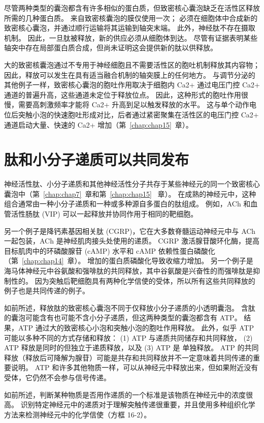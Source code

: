 尽管两种类型的囊泡都含有许多相似的蛋白质，但致密核心囊泡缺乏在活性区释放所需的几种蛋白质。
来自致密核囊泡的膜仅使用一次； 必须在细胞体中合成新的致密核心囊泡，并通过顺行运输将其运输到轴突末端。
此外，神经肽不存在摄取机制。
因此，一旦肽被释放，新的供应必须从细胞体到达。
尽管有证据表明某些轴突中存在局部蛋白质合成，但尚未证明这会提供新的肽以供释放。


大的致密核囊泡通过不专用于神经细胞且不需要活性区的胞吐机制释放其内容物；
因此，释放可以发生在具有适当融合机制的轴突膜上的任何地方。
与调节分泌的其他例子一样，致密核心囊泡的胞吐作用取决于细胞内 Ca2+ 通过电压门控 Ca2+ 通道的普遍升高，这些通道未定位于释放位点。
因此，这种形式的胞吐作用很慢，需要高刺激频率才能将 Ca2+ 升高到足以触发释放的水平。
这与单个动作电位后突触小泡的快速胞吐形成对比，后者通过紧密聚集在活性区的电压门控 Ca2+ 通道启动大量、快速的 Ca2+ 增加（第~\ref{chap:chap15}~章）。



\section{肽和小分子递质可以共同发布}

神经活性肽、小分子递质和其他神经活性分子共存于某些神经元的同一个致密核心囊泡中（第~\ref{chap:chap7}~章和第~\ref{chap:chap15} ~章）。
在成熟的神经元中，这种组合通常由一种小分子递质和一种或多种源自多蛋白的肽组成。
例如，ACh 和血管活性肠肽 (VIP) 可以一起释放并协同作用于相同的靶细胞。


另一个例子是降钙素基因相关肽 (CGRP)，它在大多数脊髓运动神经元中与 ACh 一起包装，ACh 是神经肌肉接头处使用的递质。
CGRP 激活腺苷酸环化酶，提高目标肌肉中的环磷酸腺苷 (cAMP) 水平和 cAMP 依赖性蛋白磷酸化（第~\ref{chap:chap14}~章）。
增加的蛋白质磷酸化导致收缩力增加。
另一个例子是海马体神经元中谷氨酸和强啡肽的共同释放，其中谷氨酸是兴奋性的而强啡肽是抑制性的。
因为突触后靶细胞具有两种化学信使的受体，所以所有这些共同释放的例子也是共同传递的例子。


如前所述，释放肽的致密核心囊泡不同于仅释放小分子递质的小透明囊泡。
含肽的囊泡可能含有也可能不含小分子递质，但这两种类型的囊泡都含有 ATP。
结果，ATP 通过大的致密核心小泡和突触小泡的胞吐作用释放。
此外，似乎 ATP 可能以多种不同的方式存储和释放：
(1) ATP 与递质共同储存和共同释放，
(2) ATP 释放是同时的但独立于递质释放，以及 
(3) ATP 是 单独释放。
ATP 的共同释放（释放后可降解为腺苷）可能是共存和共同释放并不一定意味着共同传递的重要说明。
ATP 和许多其他物质一样，可以从神经元中释放出来，但如果附近没有受体，它仍然不会参与信号传递。


如前所述，判断某种物质是否用作递质的一个标准是该物质在神经元中的浓度很高。
识别特定神经元中的递质对于理解突触传递很重要，并且使用多种组织化学方法来检测神经元中的化学信使（方框 16-2）。


